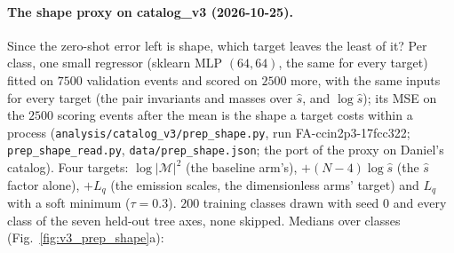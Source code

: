 \documentclass[11pt]{article}
\newcommand{\code}[1]{\texttt{#1}}
\begin{document}
\paragraph{The shape proxy on catalog\_v3 (2026-10-25).}\label{par:v3_shape_proxy} Since the zero-shot error left is shape, which target leaves
the least of it? Per class, one small regressor (sklearn MLP $(64,64)$, the same for every target) fitted on $7500$
validation events and scored on $2500$ more, with the same inputs for every target (the pair invariants and masses over
$\hat s$, and $\log\hat s$); its MSE on the $2500$ scoring events after the mean is the shape a target costs within a process
(\code{analysis/catalog\_v3/prep\_shape.py}, run FA-ccin2p3-17fcc322; \code{prep\_shape\_read.py},
\code{data/prep\_shape.json}; the port of the proxy on Daniel's catalog). Four targets: $\log|\mathcal M|^2$ (the baseline
arm's), $+(N-4)\log\hat s$ (the $\hat s$ factor alone), $+L_q$ (the emission scales, the dimensionless arms' target) and
$L_q$ with a soft minimum ($\tau=0.3$). $200$ training classes drawn with seed $0$ and every class of the seven held-out
tree axes, none skipped. Medians over classes (Fig.~\ref{fig:v3_prep_shape}a):
\end{document}

